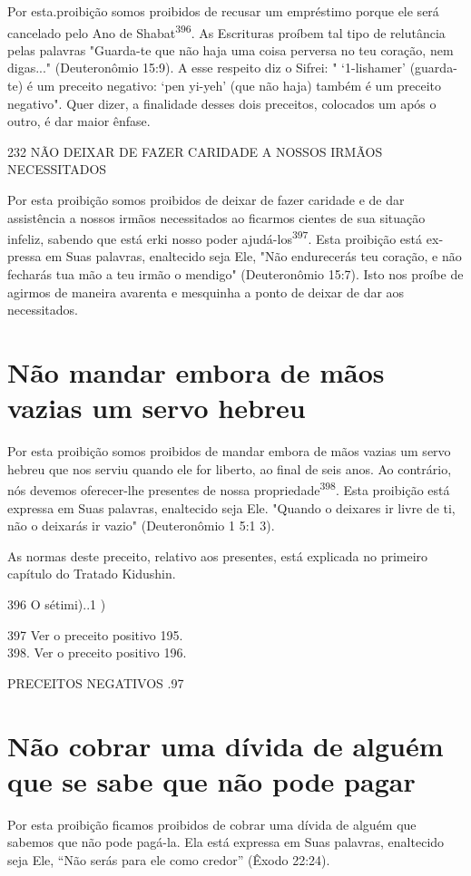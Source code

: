 Por esta.proibição somos proibidos de recusar um empréstimo por­que ele
será cancelado pelo Ano de Shabat\textsuperscript{396}. As Escrituras
proíbem tal tipo de relutância pelas palavras "Guarda-te que não haja
uma coisa perversa no teu coração, nem digas..." (Deuteronômio 15:9). A
esse respeito diz o Sifrei: " `1-lis­hamer' (guarda-te) é um preceito
negativo: `pen yi-yeh' (que não haja) também é um preceito negativo".
Quer dizer, a finalidade desses dois preceitos, coloca­dos um após o
outro, é dar maior ênfase.

232 NÃO DEIXAR DE FAZER CARIDADE A NOSSOS IRMÃOS NECESSITADOS

Por esta proibição somos proibidos de deixar de fazer caridade e de dar
assistência a nossos irmãos necessitados ao ficarmos cientes de sua
situação infeliz, sabendo que está erki nosso poder
ajudá-los\textsuperscript{397}. Esta proibição está ex­pressa em Suas
palavras, enaltecido seja Ele, "Não endurecerás teu coração, e não
fecharás tua mão a teu irmão o mendigo" (Deuteronômio 15:7). Isto nos
proíbe de agirmos de maneira avarenta e mesquinha a ponto de deixar de
dar aos necessitados.

\section{Não mandar embora de mãos vazias um servo hebreu}

Por esta proibição somos proibidos de mandar embora de mãos va­zias um
servo hebreu que nos serviu quando ele for liberto, ao final de seis
anos. Ao contrário, nós devemos oferecer-lhe presentes de nossa
propriedade\textsuperscript{398}. Es­ta proibição está expressa em Suas
palavras, enaltecido seja Ele. "Quando o dei­xares ir livre de ti, não o
deixarás ir vazio" (Deuteronômio 1 5:1 3).

As normas deste preceito, relativo aos presentes, está explicada no
primeiro capítulo do Tratado Kidushin.

396 O sétimi)..1 )


397 Ver o preceito positivo 195.\\
398. Ver o preceito positivo 196.


PRECEITOS NEGATIVOS .97

\section{Não cobrar uma dívida de alguém que se sabe que não pode pagar}

Por esta proibição ficamos proibidos de cobrar uma dívida de alguém que
sabemos que não pode pagá-la. Ela está expressa em Suas palavras,
enalte­cido seja Ele, ``Não serás para ele como credor'' (Êxodo 22:24).

